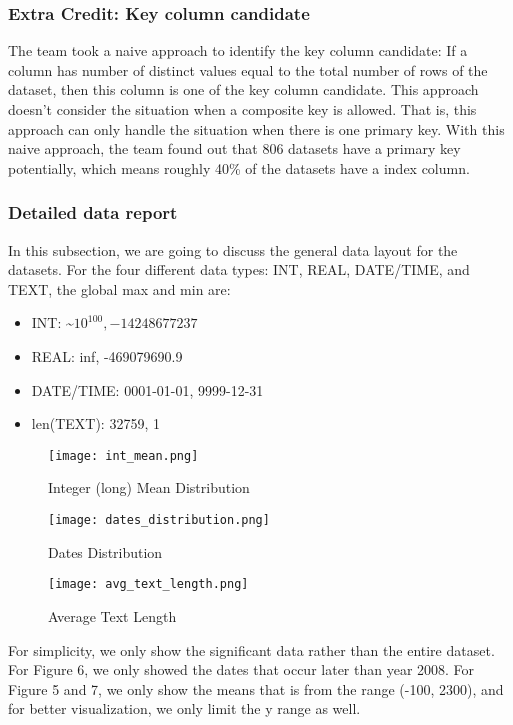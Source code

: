 \documentclass[sigconf]{acmart}
\begin{document}
\subsubsection{Extra Credit: Key column candidate} The team took a naive approach to identify the key column candidate: If a column has number of distinct values equal to the total number of rows of the dataset, then this column is one of the key column candidate. This approach doesn't consider the situation when a composite key is allowed. That is, this approach can only handle the situation when there is one primary key. With this naive approach, the team found out that 806 datasets have a primary key potentially, which means roughly 40\% of the datasets have a index column.
\subsubsection{Detailed data report} In this subsection, we are going to discuss the general data layout for the datasets. For the four different data types: INT, REAL, DATE/TIME, and TEXT, the global max and min are:
\begin{itemize}
    \item INT: \textasciitilde$10^{100}, -14248677237$
    \item REAL: inf, -469079690.9
    \item DATE/TIME: 0001-01-01, 9999-12-31
    \item len(TEXT): 32759, 1
\end{itemize}
\begin{figure}[htp]
    \centering
    \texttt{[image: int\_mean.png]}
    \caption{Integer (long) Mean Distribution}
    \label{fig:galaxy}
\end{figure}
\begin{figure}[htp]
    \centering
    \texttt{[image: dates\_distribution.png]}
    \caption{Dates Distribution}
    \label{fig:galaxy}
\end{figure}
\begin{figure}[htp]
    \centering
    \texttt{[image: avg\_text\_length.png]}
    \caption{Average Text Length}
    \label{fig:galaxy}
\end{figure}
For simplicity, we only show the significant data rather than the entire dataset. For Figure 6, we only showed the dates that occur later than year 2008. For Figure 5 and 7, we only show the means that is from the range (-100, 2300), and for better visualization, we only limit the y range as well.
\end{document}
